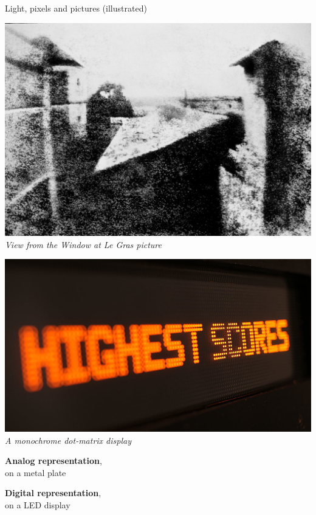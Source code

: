 \begin{frame}{Light, pixels and pictures (illustrated)}
  \begin{minipage}[b]{0.45\textwidth}
    \centering
    \includegraphics[width=\textwidth]{slides/graphics-theory/first-photo.jpg}
    \textit{\small View from the Window at Le Gras picture}
  \end{minipage}
  \hfill
  \begin{minipage}[b]{0.45\textwidth}
    \centering
    \includegraphics[width=\textwidth]{slides/graphics-theory/dot-matrix-display.jpg}
    \textit{\small A monochrome dot-matrix display}
  \end{minipage}

  \vspace{1em}

  \begin{minipage}[b]{0.45\textwidth}
    \centering
    \textbf{Analog representation},\\ on a metal plate
  \end{minipage}
  \hfill
  \begin{minipage}[b]{0.45\textwidth}
    \centering
    \textbf{Digital representation},\\ on a LED display
  \end{minipage}
\end{frame}

